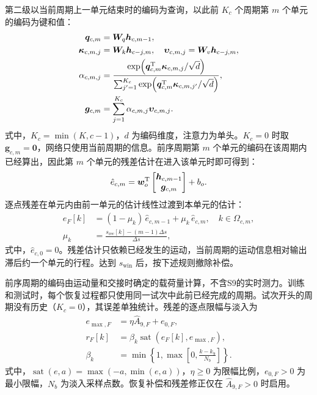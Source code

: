\documentclass{JQR_LaTeX_Template-0507/JQRnew}
\begin{document}
第二级以当前周期上一单元结束时的编码为查询，以此前 $K_c$ 个周期第 $m$ 个单元的编码为键和值：
\begin{equation}
\label{eq:cross-cycle}
\begin{aligned}
\bm q_{c,m}&=\bm W_q\bm h_{c,m-1},\\
\bm\kappa_{c,m,j}&=\bm W_k\bm h_{c-j,m},\quad
\bm\upsilon_{c,m,j}=\bm W_v\bm h_{c-j,m},\\
\alpha_{c,m,j}&=\frac{\exp\!\left(\bm q_{c,m}^{\rm T}\bm\kappa_{c,m,j}/\sqrt d\right)}
{\sum_{j'=1}^{K_c}\exp\!\left(\bm q_{c,m}^{\rm T}\bm\kappa_{c,m,j'}/\sqrt d\right)},\\
\bm g_{c,m}&=\sum_{j=1}^{K_c}\alpha_{c,m,j}\bm\upsilon_{c,m,j}.
\end{aligned}
\end{equation}
式中，$K_c=\min(K,c-1)$，$d$ 为编码维度，注意力为单头。$K_c=0$ 时取 $\bm g_{c,m}=\bm 0$，网络只使用当前周期的信息。前序周期第 $m$ 个单元的编码在该周期内已经算出，因此第 $m$ 个单元的残差估计在进入该单元时即可得到：
\begin{equation}
\label{eq:cell-output}
\hat e_{c,m}=\bm w_o^{\rm T}
\begin{bmatrix}\bm h_{c,m-1}\\\bm g_{c,m}\end{bmatrix}+b_o .
\end{equation}
逐点残差在单元内由前一单元的估计线性过渡到本单元的估计：
\begin{equation}
\label{eq:cell-interp}
\begin{aligned}
e_F[k]&=(1-\mu_k)\,\hat e_{c,m-1}+\mu_k\,\hat e_{c,m},\quad k\in\Omega_{c,m},\\
\mu_k&=\frac{s_{\mathrm{rec}}[k]-(m-1)\Delta s}{\Delta s},
\end{aligned}
\end{equation}
式中，$\hat e_{c,0}=0$。残差估计只依赖已经发生的运动，当前周期的运动信息相对输出滞后约一个单元的行程。达到 $s_{\mathrm{win}}$ 后，按下述规则撤除补偿。

前序周期的编码由运动量和交接时确定的载荷量计算，不含S9的实时测力。训练和测试时，每个恢复过程都只使用同一试次中此前已经完成的周期。试次开头的周期没有历史（$K_c=0$），其误差单独统计。残差的逐点限幅与淡入为
\begin{equation}
\label{eq:residual-limit}
\begin{aligned}
e_{\max,F}&=\eta\widehat A_{9,F}+e_{0,F},\\
r_F[k]&=\beta_k\operatorname{sat}(e_F[k],e_{\max,F}),\\
\beta_k&=\min\!\left\{1,\max\!\left[0,\frac{k-k_9}{N_b}\right]\right\}.
\end{aligned}
\end{equation}
式中，$\operatorname{sat}(e,a)=\max(-a,\min(e,a))$，$\eta\ge0$ 为限幅比例，$e_{0,F}>0$ 为最小限幅，$N_b$ 为淡入采样点数。恢复补偿和残差修正仅在 $\widehat A_{9,F}>0$ 时启用。
\end{document}
